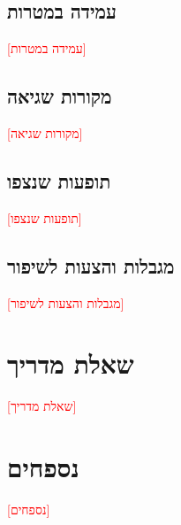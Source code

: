 \documentclass[10pt,a4paper]{article}
\newcommand{\TODO}[1]{\textcolor{red}{[#1]}}
\begin{document}
\subsection*{עמידה במטרות}
\TODO{עמידה במטרות}
\subsection*{מקורות שגיאה}
\TODO{מקורות שגיאה}
\subsection*{תופעות שנצפו}
\TODO{תופעות שנצפו}
\subsection*{מגבלות והצעות לשיפור}
\TODO{מגבלות והצעות לשיפור}

\section*{שאלת מדריך}
\TODO{שאלת מדריך}

\section*{נספחים}
\TODO{נספחים}
\end{document}
